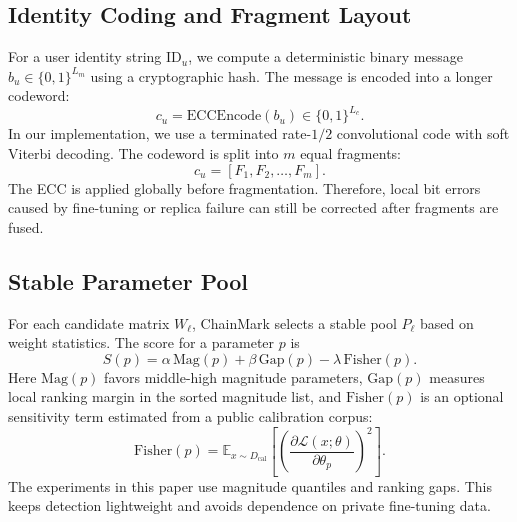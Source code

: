 \documentclass[sigconf]{acmart}
\newcommand{\method}{ChainMark}
\begin{document}
\subsection{Identity Coding and Fragment Layout}
For a user identity string $\mathrm{ID}_u$, we compute a deterministic binary message $b_u \in \{0,1\}^{L_m}$ using a cryptographic hash. The message is encoded into a longer codeword:
\begin{equation}
c_u = \mathrm{ECCEncode}(b_u) \in \{0,1\}^{L_c}.
\end{equation}
In our implementation, we use a terminated rate-$1/2$ convolutional code with soft Viterbi decoding. The codeword is split into $m$ equal fragments:
\begin{equation}
c_u = [F_1,F_2,\ldots,F_m].
\end{equation}
The ECC is applied globally before fragmentation. Therefore, local bit errors caused by fine-tuning or replica failure can still be corrected after fragments are fused.

\subsection{Stable Parameter Pool}
For each candidate matrix $W_\ell$, \method{} selects a stable pool $P_\ell$ based on weight statistics. The score for a parameter $p$ is
\begin{equation}
S(p)=\alpha\,\mathrm{Mag}(p)+\beta\,\mathrm{Gap}(p)-\lambda\,\mathrm{Fisher}(p).
\end{equation}
Here $\mathrm{Mag}(p)$ favors middle-high magnitude parameters, $\mathrm{Gap}(p)$ measures local ranking margin in the sorted magnitude list, and $\mathrm{Fisher}(p)$ is an optional sensitivity term estimated from a public calibration corpus:
\begin{equation}
\mathrm{Fisher}(p)=\mathbb{E}_{x\sim D_{\mathrm{cal}}}\left[\left(\frac{\partial \mathcal{L}(x;\theta)}{\partial \theta_p}\right)^2\right].
\end{equation}
The experiments in this paper use magnitude quantiles and ranking gaps. This keeps detection lightweight and avoids dependence on private fine-tuning data.
\end{document}
